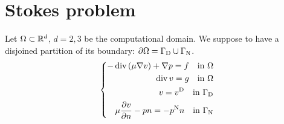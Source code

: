 %
\section{Stokes problem}\label{sec:}
%
Let $\Omega\subset \mathbb R^d$, $d=2,3$ be the computational domain. We suppose to have a disjoined partition of its boundary:
$\partial\Omega=\Gamma_{\rm D}\cup\Gamma_{\rm N}$.
%
\begin{equation}\label{eq:stokes:strongform}
%
\left\{
\begin{aligned}
-\div\left(\mu\nabla v\right) + \nabla p = f \quad \mbox{in $\Omega$}\\
\div v  = g \quad \mbox{in $\Omega$}\\
v = \vD \quad \mbox{in $\GammaD$}\\
\mu\frac{\partial v}{\partial n} - p n = -\pN n\quad \mbox{in $\GammaN$}
\end{aligned}
\right.
%
\end{equation}
%
%
